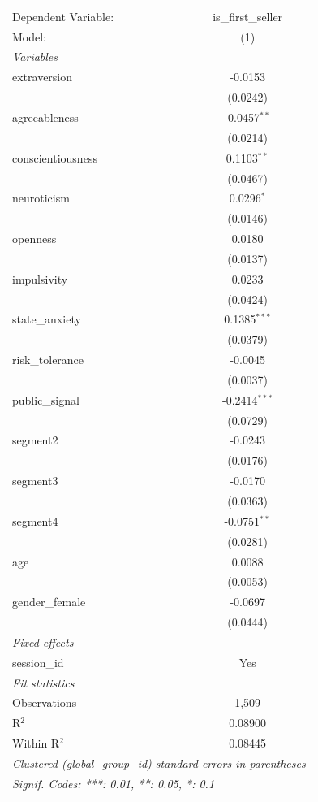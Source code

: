 
\begingroup
\centering
\scriptsize
\begin{tabular}{lc}
   \tabularnewline \midrule \midrule
   Dependent Variable: & is\_first\_seller\\    
   Model:              & (1)\\  
   \midrule
   \emph{Variables}\\
   extraversion        & -0.0153\\   
                       & (0.0242)\\   
   agreeableness       & -0.0457$^{**}$\\   
                       & (0.0214)\\   
   conscientiousness   & 0.1103$^{**}$\\   
                       & (0.0467)\\   
   neuroticism         & 0.0296$^{*}$\\   
                       & (0.0146)\\   
   openness            & 0.0180\\   
                       & (0.0137)\\   
   impulsivity         & 0.0233\\   
                       & (0.0424)\\   
   state\_anxiety      & 0.1385$^{***}$\\   
                       & (0.0379)\\   
   risk\_tolerance     & -0.0045\\   
                       & (0.0037)\\   
   public\_signal      & -0.2414$^{***}$\\   
                       & (0.0729)\\   
   segment2            & -0.0243\\   
                       & (0.0176)\\   
   segment3            & -0.0170\\   
                       & (0.0363)\\   
   segment4            & -0.0751$^{**}$\\   
                       & (0.0281)\\   
   age                 & 0.0088\\   
                       & (0.0053)\\   
   gender\_female      & -0.0697\\   
                       & (0.0444)\\   
   \midrule
   \emph{Fixed-effects}\\
   session\_id         & Yes\\  
   \midrule
   \emph{Fit statistics}\\
   Observations        & 1,509\\  
   R$^2$               & 0.08900\\  
   Within R$^2$        & 0.08445\\  
   \midrule \midrule
   \multicolumn{2}{l}{\emph{Clustered (global\_group\_id) standard-errors in parentheses}}\\
   \multicolumn{2}{l}{\emph{Signif. Codes: ***: 0.01, **: 0.05, *: 0.1}}\\
\end{tabular}
\par\endgroup


